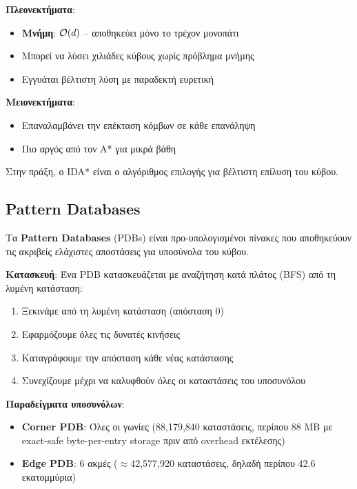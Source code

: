 \textbf{Πλεονεκτήματα}:
\begin{itemize}
    \item \textbf{Μνήμη}: $\mathcal{O}(d)$ -- αποθηκεύει μόνο το τρέχον μονοπάτι
    \item Μπορεί να λύσει χιλιάδες κύβους χωρίς πρόβλημα μνήμης
    \item Εγγυάται βέλτιστη λύση με παραδεκτή ευρετική
\end{itemize}

\textbf{Μειονεκτήματα}:
\begin{itemize}
    \item Επαναλαμβάνει την επέκταση κόμβων σε κάθε επανάληψη
    \item Πιο αργός από τον A* για μικρά βάθη
\end{itemize}

Στην πράξη, ο IDA* είναι ο αλγόριθμος επιλογής για βέλτιστη επίλυση του κύβου.

\subsection{Pattern Databases}
\label{subsec:pattern_databases}

Τα \textbf{Pattern Databases} (PDBs) \cite{korf1997finding,culberson1998pattern} είναι προ-υπολογισμένοι πίνακες που αποθηκεύουν τις ακριβείς ελάχιστες αποστάσεις για υποσύνολα του κύβου.

\textbf{Κατασκευή}: Ένα PDB κατασκευάζεται με αναζήτηση κατά πλάτος (BFS) από τη λυμένη κατάσταση:

\begin{enumerate}
    \item Ξεκινάμε από τη λυμένη κατάσταση (απόσταση 0)
    \item Εφαρμόζουμε όλες τις δυνατές κινήσεις
    \item Καταγράφουμε την απόσταση κάθε νέας κατάστασης
    \item Συνεχίζουμε μέχρι να καλυφθούν όλες οι καταστάσεις του υποσυνόλου
\end{enumerate}

\textbf{Παραδείγματα υποσυνόλων}:
\begin{itemize}
    \item \textbf{Corner PDB}: Όλες οι γωνίες (88,179,840 καταστάσεις, περίπου 88 MB με exact-safe byte-per-entry storage πριν από overhead εκτέλεσης)
    \item \textbf{Edge PDB}: 6 ακμές ($\approx$42,577,920 καταστάσεις, δηλαδή περίπου 42.6 εκατομμύρια)
\end{itemize}

